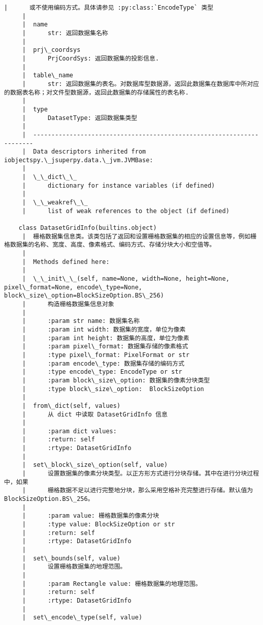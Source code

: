 \documentclass[11pt]{article}
\begin{document}
\begin{Verbatim}[commandchars=\\\{\}]
     |      或不使用编码方式。具体请参见 :py:class:`EncodeType` 类型
     |  
     |  name
     |      str: 返回数据集名称
     |  
     |  prj\_coordsys
     |      PrjCoordSys: 返回数据集的投影信息.
     |  
     |  table\_name
     |      str: 返回数据集的表名。对数据库型数据源，返回此数据集在数据库中所对应的数据表名称；对文件型数据源，返回此数据集的存储属性的表名称.
     |  
     |  type
     |      DatasetType: 返回数据集类型
     |  
     |  ----------------------------------------------------------------------
     |  Data descriptors inherited from iobjectspy.\_jsuperpy.data.\_jvm.JVMBase:
     |  
     |  \_\_dict\_\_
     |      dictionary for instance variables (if defined)
     |  
     |  \_\_weakref\_\_
     |      list of weak references to the object (if defined)
    
    class DatasetGridInfo(builtins.object)
     |  栅格数据集信息类。该类包括了返回和设置栅格数据集的相应的设置信息等，例如栅格数据集的名称、宽度、高度、像素格式、编码方式、存储分块大小和空值等。
     |  
     |  Methods defined here:
     |  
     |  \_\_init\_\_(self, name=None, width=None, height=None, pixel\_format=None, encode\_type=None, block\_size\_option=BlockSizeOption.BS\_256)
     |      构造栅格数据集信息对象
     |      
     |      :param str name: 数据集名称
     |      :param int width: 数据集的宽度，单位为像素
     |      :param int height: 数据集的高度，单位为像素
     |      :param pixel\_format: 数据集存储的像素格式
     |      :type pixel\_format: PixelFormat or str
     |      :param encode\_type: 数据集存储的编码方式
     |      :type encode\_type: EncodeType or str
     |      :param block\_size\_option: 数据集的像素分块类型
     |      :type block\_size\_option:  BlockSizeOption
     |  
     |  from\_dict(self, values)
     |      从 dict 中读取 DatasetGridInfo 信息
     |      
     |      :param dict values:
     |      :return: self
     |      :rtype: DatasetGridInfo
     |  
     |  set\_block\_size\_option(self, value)
     |      设置数据集的像素分块类型。以正方形方式进行分块存储。其中在进行分块过程中，如果
     |      栅格数据不足以进行完整地分块，那么采用空格补充完整进行存储。默认值为 BlockSizeOption.BS\_256。
     |      
     |      :param value: 栅格数据集的像素分块
     |      :type value: BlockSizeOption or str
     |      :return: self
     |      :rtype: DatasetGridInfo
     |  
     |  set\_bounds(self, value)
     |      设置栅格数据集的地理范围。
     |      
     |      :param Rectangle value: 栅格数据集的地理范围。
     |      :return: self
     |      :rtype: DatasetGridInfo
     |  
     |  set\_encode\_type(self, value)

\end{Verbatim}
\end{document}
